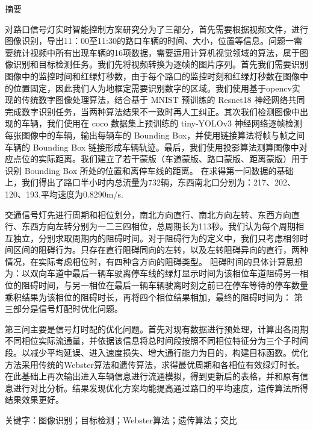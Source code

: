 \begin{center}
    摘\qquad 要
\end{center}
\qquad 对路口信号灯实时智能控制方案研究分为了三部分，首先需要根据视频文件，进行图像识别，导出11：00至11:30的路口车辆的时间、大小，位置等信息。问题一需要统计视频中所有出现车辆的16项数据，需要运用计算机视觉领域的算法，属于图像识别和目标检测任务。我们先将视频转换为逐帧的图片序列。首先我们需要识别图像中的监控时间和红绿灯秒数，由于每个路口的监控时刻和红绿灯秒数在图像中的位置固定，因此我们人为地框定需要识别数字的区域。我们使用基于opencv实现的传统数字图像处理算法，结合基于 MNIST 预训练的 Resnet18 神经网络共同完成数字识别任务，当两种算法结果不一致时再人工纠正。其次我们检测图像中出现的车辆，我们使用在 coco 数据集上预训练的 tiny-YOLOv3 神经网络逐帧检测每张图像中的车辆，输出每辆车的 Bounding Box，并使用链接算法将帧与帧之间车辆的 Bounding Box 链接形成车辆轨迹。最后，我们使用投影算法测算图像中对应点位的实际距离。我们建立了若干蒙版（车道蒙版、路口蒙版、距离蒙版）用于识别 Bounding Box 所处的位置和离停车线的距离。
在求得第一问数据的基础上，我们得出了路口半小时内总流量为732辆，东西南北口分别为：217、202、120、193.平均速度为0.8290m/s.

交通信号灯先进行周期和相位划分，南北方向直行、南北方向左转、东西方向直行、东西方向左转分别为一二三四相位，总周期长为113秒。我们认为每个周期相互独立，分别求取周期内的阻碍时间。对于阻碍行为的定义中，我们只考虑相邻时间区间的阻碍行为。只存在直行阻碍同向的左转，以及左转阻碍异向的直行，两种情况，在实际考虑相位时，有四种含方向的阻碍类型。
阻碍时间的具体计算思想为：以双向车道中最后一辆车驶离停车线的绿灯显示时间为该相位车道阻碍另一相位的阻碍时间，与另一相位在最后一辆车辆驶离时刻之前已在停车等待的停车数量乘积结果为该相位的阻碍时长，再将四个相位结果相加，最终的阻碍时间为：
第三部分是信号灯配时优化问题。

第三问主要是信号灯时配的优化问题。首先对现有数据进行预处理，计算出各周期不同相位实际流通量，并依据该信息将总时间段按照不同相位特征分为三个子时间段。以减少平均延误、进入速度损失、增大通行能力为目的，构建目标函数。优化方法采用传统的Webster算法和遗传算法，求得最优周期和各相位有效绿灯时长。在此基础上再次输出进入车辆信息进行流通模拟，得到更新后的表格，并和原有信息进行对比分析。结果发现优化方案均能提高通过路口的平均速度，遗传算法所得结果效果更好。

关键字：图像识别；目标检测；Webster算法；遗传算法；交比